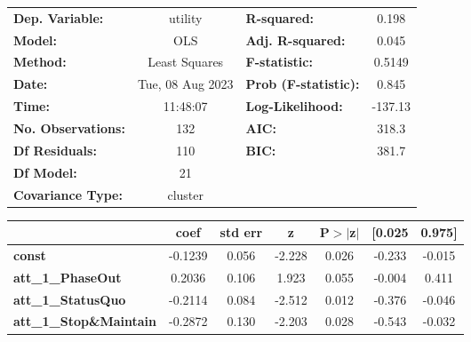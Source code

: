 \begin{center}
\begin{tabular}{lclc}
\toprule
\textbf{Dep. Variable:}                             &     utility      & \textbf{  R-squared:         } &     0.198   \\
\textbf{Model:}                                     &       OLS        & \textbf{  Adj. R-squared:    } &     0.045   \\
\textbf{Method:}                                    &  Least Squares   & \textbf{  F-statistic:       } &    0.5149   \\
\textbf{Date:}                                      & Tue, 08 Aug 2023 & \textbf{  Prob (F-statistic):} &    0.845    \\
\textbf{Time:}                                      &     11:48:07     & \textbf{  Log-Likelihood:    } &   -137.13   \\
\textbf{No. Observations:}                          &         132      & \textbf{  AIC:               } &     318.3   \\
\textbf{Df Residuals:}                              &         110      & \textbf{  BIC:               } &     381.7   \\
\textbf{Df Model:}                                  &          21      & \textbf{                     } &             \\
\textbf{Covariance Type:}                           &     cluster      & \textbf{                     } &             \\
\bottomrule
\end{tabular}
\begin{tabular}{lcccccc}
                                                    & \textbf{coef} & \textbf{std err} & \textbf{z} & \textbf{P$> |$z$|$} & \textbf{[0.025} & \textbf{0.975]}  \\
\midrule
\textbf{const}                                      &      -0.1239  &        0.056     &    -2.228  &         0.026        &       -0.233    &       -0.015     \\
\textbf{att\_1\_PhaseOut}                           &       0.2036  &        0.106     &     1.923  &         0.055        &       -0.004    &        0.411     \\
\textbf{att\_1\_StatusQuo}                          &      -0.2114  &        0.084     &    -2.512  &         0.012        &       -0.376    &       -0.046     \\
\textbf{att\_1\_Stop\&Maintain}                     &      -0.2872  &        0.130     &    -2.203  &         0.028        &       -0.543    &       -0.032     \\

\end{tabular}
\end{center}
